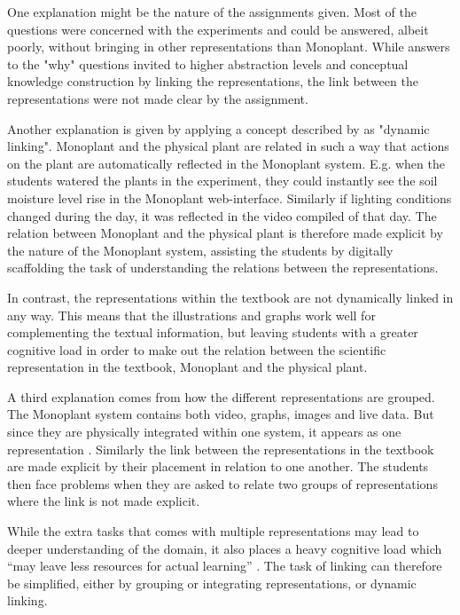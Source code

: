 One explanation might be the nature of the assignments given. Most of the questions were concerned with the experiments and could be answered, albeit poorly, without bringing in other representations than Monoplant. While answers to the "why" questions invited to higher abstraction levels and conceptual knowledge construction by linking the representations, the link between the representations were not made clear by the assignment. 

Another explanation is given by applying a concept described by \citet{van2006supporting} as "dynamic linking". Monoplant and the physical plant are related in such a way that actions on the plant are automatically reflected in the Monoplant system. E.g. when the students watered the plants in the experiment, they could instantly see the soil moisture level rise in the Monoplant web-interface. Similarly if lighting conditions changed during the day, it was reflected in the video compiled of that day. The relation between Monoplant and the physical plant is therefore made explicit by the nature of the Monoplant system, assisting the students by digitally scaffolding the task of understanding the relations between the representations. 

In contrast, the representations within the textbook are not dynamically linked in any way. This means that the illustrations and graphs work well for complementing the textual information, but leaving students with a greater cognitive load in order to make out the relation between the scientific representation in the textbook, Monoplant and the physical plant. 

A third explanation comes from how the different representations are grouped. The Monoplant system contains both video, graphs, images and live data. But since they are physically integrated within one system, it appears as one representation \citep{van2006supporting}. Similarly the link between the representations in the textbook are made explicit by their placement in relation to one another. The students then face problems when they are asked to relate two groups of representations where the link is not made explicit. 

While the extra tasks that comes with multiple representations may lead to deeper understanding of the domain, it also places a heavy cognitive load which “may leave less resources for actual learning” \citetext{Sweller, 1988, 1989, referenced in \citealp{van2006supporting}}. The task of linking can therefore be simplified, either by grouping or integrating representations, or dynamic linking. 

